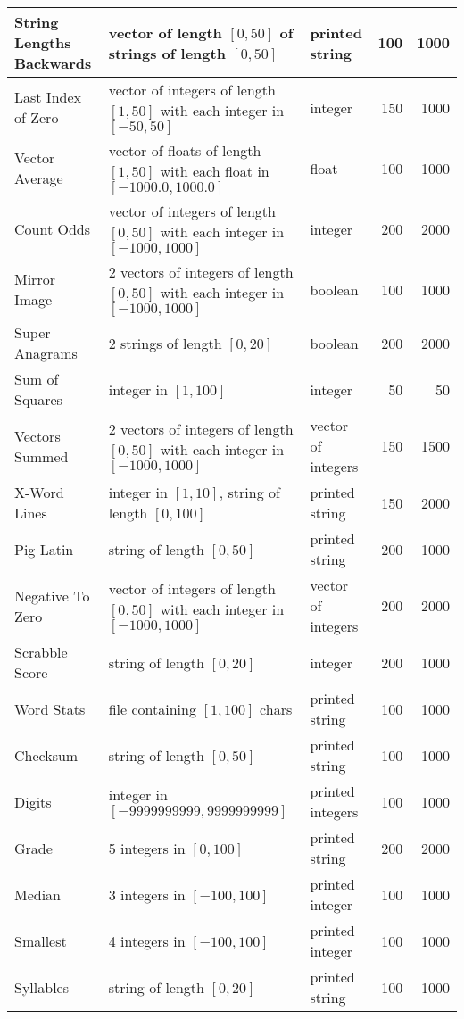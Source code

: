 \documentclass{sig-alternate}
\begin{document}
\begin{table*}[t]
\begin{tabular}{|l | >{\raggedright}p{7.4cm} l rr|}
\hline
String Lengths Backwards & vector of length $[0, 50]$ of strings of length $[0, 50]$ & printed string & 100 & 1000 \\
\hline
Last Index of Zero & vector of integers of length $[1, 50]$ with each integer in $[-50, 50]$ & integer & 150 & 1000 \\
\hline
Vector Average & vector of floats of length $[1,50]$ with each float in $[-1000.0, 1000.0]$ & float & 100 & 1000 \\
\hline
Count Odds & vector of integers of length $[0,50]$ with each integer in $[-1000, 1000]$ & integer & 200 & 2000 \\
\hline
Mirror Image & 2 vectors of integers of length $[0,50]$ with each integer in $[-1000, 1000]$ & boolean & 100 & 1000 \\
\hline
Super Anagrams & 2 strings of length $[0, 20]$ & boolean & 200 & 2000 \\
\hline
Sum of Squares & integer in $[1, 100]$ & integer & 50 & 50 \\
\hline
Vectors Summed & 2 vectors of integers of length $[0,50]$ with each integer in $[-1000, 1000]$ & vector of integers & 150 & 1500 \\
\hline
X-Word Lines & integer in $[1, 10]$, string of length $[0, 100]$ & printed string & 150 & 2000 \\
\hline
Pig Latin & string of length $[0, 50]$ & printed string & 200 & 1000 \\
\hline
Negative To Zero & vector of integers of length $[0,50]$ with each integer in $[-1000, 1000]$ & vector of integers & 200 & 2000 \\
\hline
Scrabble Score & string of length $[0, 20]$ & integer & 200 & 1000 \\
\hline
Word Stats & file containing $[1, 100]$ chars & printed string & 100 & 1000 \\
\hline
Checksum & string of length $[0, 50]$ & printed string & 100 & 1000 \\
\hline
Digits & integer in $[-9999999999, 9999999999]$ & printed integers & 100 & 1000 \\
\hline
Grade & 5 integers in $[0, 100]$ & printed string & 200 & 2000 \\
\hline
Median & 3 integers in $[-100, 100]$ & printed integer & 100 & 1000 \\
\hline
Smallest & 4 integers in $[-100, 100]$ & printed integer & 100 & 1000 \\
\hline
Syllables & string of length $[0, 20]$ & printed string & 100 & 1000\\
\hline
\end{tabular}
\end{table*}
\end{document}
